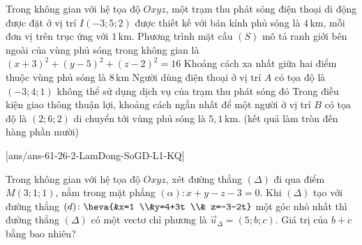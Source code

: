 \begin{ex}%
	Trong không gian với hệ tọa độ $Oxyz$, một trạm thu phát sóng điện thoại di động được đặt ở vị trí $I(-3; 5; 2)$ được thiết kế với bán kính phủ sóng là $4\,\text{km}$, mỗi đơn vị trên trục ứng với $1\,\text{km}$.
	\choiceTF
	{\True Phương trình mặt cầu $(S)$ mô tả ranh giới bên ngoài của vùng phủ sóng trong không gian là\\ $(x+3)^2 + (y-5)^2 + (z-2)^2 = 16$}
	{\True Khoảng cách xa nhất giữa hai điểm thuộc vùng phủ sóng là $8\,\text{km}$}
	{Người dùng điện thoại ở vị trí $A$ có tọa độ là $(-3; 4; 1)$ không thể sử dụng dịch vụ của trạm thu phát sóng đó}
	{Trong điều kiện giao thông thuận lợi, khoảng cách ngắn nhất để một người ở vị trí $B$ có tọa độ là $(2; 6; 2)$ di chuyển tới vùng phủ sóng là $5{,}1\,\text{km}$. (kết quả làm tròn đến hàng phần mười)}
\end{ex}


\caukq
{}[ans/ans-61-26-2-LamDong-SoGD-L1-KQ]

\begin{ex}%
	Trong không gian với hệ tọa độ $Oxyz$, xét đường thẳng $(\Delta)$ đi qua điểm $M(3;1;1)$, nằm trong mặt phẳng $(\alpha) \colon x+y-z-3=0$. Khi $(\Delta)$ tạo với đường thẳng $(d) \colon \heva{&x=1 \\&y=4+3t \\& z=-3-2t}$ một góc nhỏ nhất thì đường thẳng $(\Delta)$ có một vectơ chỉ phương là $\vec{u}_{\Delta}=(5;b;c)$. Giá trị của $b+c$ bằng bao nhiêu?
\end{ex}

